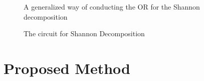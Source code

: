
  
\begin{figure}[t]
  \begin{minipage}{0.46\linewidth}
    \begin{center}
      \scalebox{0.7} {
        
      }
    \end{center}
    \caption{Generalization of Fig.~\ref{fig-urtof}, which also implements the Boolean product of two functions}
    \label{fig-f-dot-g}
  \end{minipage}
  \begin{minipage}{0.46\linewidth}
    \begin{center}
      \scalebox{0.9} {
        
      }
      \caption{A generalized way of conducting the OR for the Shannon decomposition}
      \label{fig-bool-or}
    \end{center}
  \end{minipage}
\end{figure}
\begin{figure}[t]
  \begin{minipage}{\linewidth}
    \begin{center}
      \scalebox{0.8} {
        
      }
    \end{center}
    \caption{The circuit for Shannon Decomposition}
    \label{fig-shannon}
  \end{minipage}
\end{figure}
\section{Proposed Method}
\label{Sec:proposed}

